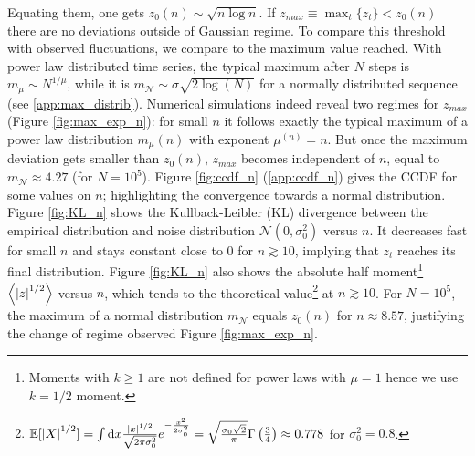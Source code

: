 \documentclass[FinalReport.tex]{subfiles}
\begin{document}
Equating them, one gets $z_0(n)\sim\sqrt{n\log{n}}$. If $z_{max}\equiv\max_{t}\{z_t\}<z_0(n)$ there are no deviations outside of Gaussian regime. To compare this threshold with observed fluctuations, we compare to the maximum value reached.
 With power law distributed time series, the typical maximum after $N$ steps is $m_\mu\sim N^{1/\mu}$, while it is $m_\mathcal{N}\sim\sigma\sqrt{2\log(N)}$ for a normally distributed sequence (see  \autoref{app:max_distrib}). Numerical simulations indeed reveal two regimes for $z_{max}$ (Figure \ref{fig:max_exp_n}): for small $n$ it follows exactly the typical maximum of a power law distribution $m_\mu(n)$ with exponent $\mu^{(n)}=n$. But once the maximum deviation gets smaller than $z_0(n)$, $z_{max}$ becomes independent of $n$, equal to $m_\mathcal{N}\approx 4.27$ (for $N=10^5$). Figure \ref{fig:ccdf_n} (\autoref{app:ccdf_n}) gives the CCDF for some values on $n$; highlighting the convergence towards a normal distribution.
Figure \ref{fig:KL_n} shows the Kullback-Leibler (KL) divergence between the empirical distribution and noise distribution $\mathcal{N}(0,\sigma_0^2)$ versus $n$. It decreases fast for small $n$ and stays constant close to $0$ for $n\gtrsim10$, implying that $z_t$ reaches its final distribution. 
Figure \ref{fig:KL_n} also shows the absolute half moment\footnote{Moments with $k\geq1$ are not defined for power laws with $\mu=1$ hence we use $k=1/2$ moment.} $\expval{\abs{z}^{1/2}}$ versus $n$, which tends to the theoretical value\footnote{$\mathbb{E}[\abs{X}^{1/2}]=\int \textrm{d} x \frac{\abs{x}^{1/2}}{\sqrt{2\pi\sigma_0^2}}e^{-\frac{x^2}{2\sigma_0^2}}=\sqrt{\frac{\sigma_0\sqrt{2}}{\pi}}\Gamma\left(\frac{3}{4}\right)\approx 0.778$ for $\sigma_0^2=0.8$.} at $n\gtrsim 10$. For $N=10^5$, the maximum of a normal distribution $m_\mathcal{N}$ equals $z_0(n)$ for $n\approx 8.57$, justifying the change of regime observed Figure \ref{fig:max_exp_n}.
\end{document}
